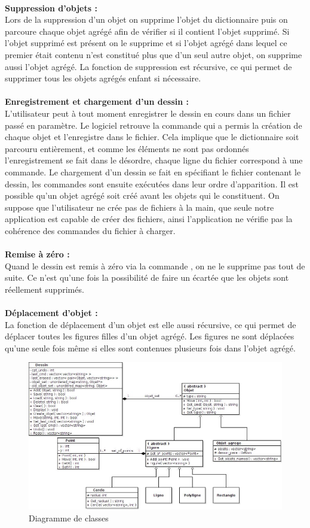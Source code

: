 \documentclass[legalpaper]{article}
\begin{document}
\\
\textbf{Suppression d'objets :}\\
\hspace*{\parindent}Lors de la suppression d'un objet on supprime l'objet du dictionnaire puis on parcoure chaque objet agrégé afin de vérifier si il contient l'objet supprimé. Si l'objet supprimé est présent on le supprime et si l'objet agrégé dans lequel ce premier était contenu n'est constitué plus que d'un seul autre objet, on supprime aussi l'objet agrégé. La fonction de suppression est récursive, ce qui permet de supprimer tous les objets agrégés enfant si nécessaire.\\
\\
\textbf{Enregistrement et chargement d'un dessin :} \\
\hspace*{\parindent}L'utilisateur peut à tout moment enregistrer le dessin en cours dans un fichier passé en paramètre. Le logiciel retrouve la commande qui a permis la création de chaque objet et l'enregistre dans le fichier. Cela implique que le dictionnaire soit parcouru entièrement, et comme les éléments ne sont pas ordonnés l'enregistrement se fait dans le désordre, chaque ligne du fichier correspond à une commande. Le chargement d'un dessin se fait en spécifiant le fichier contenant le dessin, les commandes sont ensuite exécutées dans leur ordre d'apparition. Il est possible qu'un objet agrégé soit créé avant les objets qui le constituent. On suppose que l'utilisateur ne crée pas de fichiers à la main, que seule notre application est capable de créer des fichiers, ainsi l'application ne vérifie pas la cohérence des commandes du fichier à charger.\\
\\
\textbf{Remise à zéro :}\\
\hspace*{\parindent}Quand le dessin est remis à zéro via la commande , on ne le supprime pas tout de suite. Ce n'est qu'une fois la possibilité de faire un  écartée que les objets sont réellement supprimés.\\
\\
\textbf{Déplacement d'objet :}\\
\hspace*{\parindent}La fonction de déplacement d'un objet est elle aussi récursive, ce qui permet de déplacer toutes les figures filles d'un objet agrégé. Les figures ne sont déplacées qu'une seule fois même si elles sont contenues plusieurs fois dans l'objet agrégé.\\
\begin{figure}
    \centering
\includegraphics[width=30cm]{Diagramme_objet}
    \caption{Diagramme de classes}
    \label{fig:awesome_image}
\end{figure}
\end{document}
